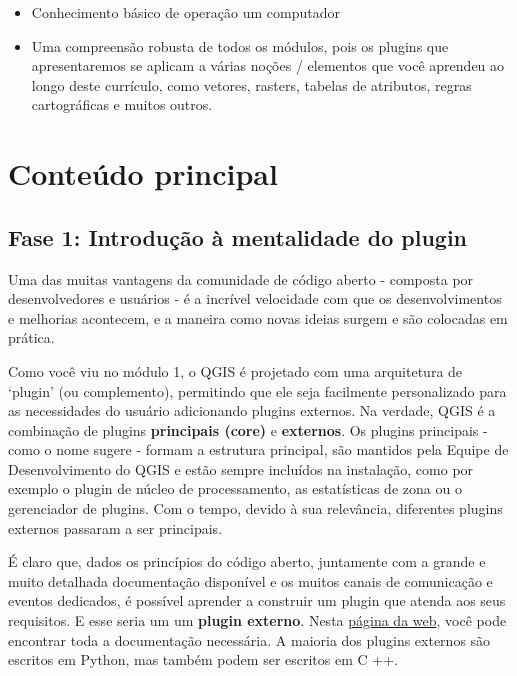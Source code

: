 \documentclass[
]{book}
\providecommand{\tightlist}{%
  \setlength{\itemsep}{0pt}\setlength{\parskip}{0pt}}
\begin{document}
\begin{itemize}
\tightlist
\item
  Conhecimento básico de operação um computador
\item
  Uma compreensão robusta de todos os módulos, pois os plugins que apresentaremos se aplicam a várias noções / elementos que você aprendeu ao longo deste currículo, como vetores, rasters, tabelas de atributos, regras cartográficas e muitos outros.
\end{itemize}

\hypertarget{conteuxfado-principal-9}{%
\section{Conteúdo principal}\label{conteuxfado-principal-9}}

\hypertarget{fase-1-introduuxe7uxe3o-uxe0-mentalidade-do-plugin}{%
\subsection{Fase 1: Introdução à mentalidade do plugin}\label{fase-1-introduuxe7uxe3o-uxe0-mentalidade-do-plugin}}

Uma das muitas vantagens da comunidade de código aberto - composta por desenvolvedores e usuários - é a incrível velocidade com que os desenvolvimentos e melhorias acontecem, e a maneira como novas ideias surgem e são colocadas em prática.

Como você viu no módulo 1, o QGIS é projetado com uma arquitetura de `plugin' (ou complemento), permitindo que ele seja facilmente personalizado para as necessidades do usuário adicionando plugins externos. Na verdade, QGIS é a combinação de plugins \textbf{principais (core)} e \textbf{externos}. Os plugins principais - como o nome sugere - formam a estrutura principal, são mantidos pela Equipe de Desenvolvimento do QGIS e estão sempre incluídos na instalação, como por exemplo o plugin de núcleo de processamento, as estatísticas de zona ou o gerenciador de plugins. Com o tempo, devido à sua relevância, diferentes plugins externos passaram a ser principais.

É claro que, dados os princípios do código aberto, juntamente com a grande e muito detalhada documentação disponível e os muitos canais de comunicação e eventos dedicados, é possível aprender a construir um plugin que atenda aos seus requisitos. E esse seria um um \textbf{plugin externo}. Nesta \href{https://plugins.qgis.org/}{página da web}, você pode encontrar toda a documentação necessária. A maioria dos plugins externos são escritos em Python, mas também podem ser escritos em C ++.
\end{document}
